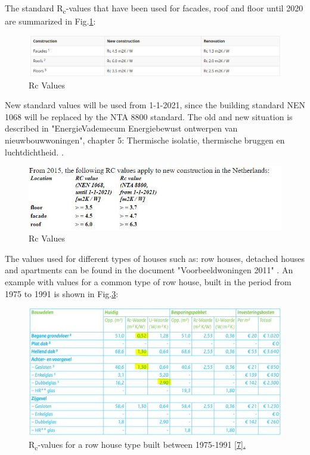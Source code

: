 The standard R\textsubscript{c}-values that have been used for facades, roof and floor until 2020 are summarized in Fig.\ref{fig:Rcvalues}:

\begin{figure}[H]
	\centering
	\includegraphics[width=1.0\columnwidth]{Pictures/Rc_values_2020.JPG}
	\caption[Short title]{Rc Values \cite{ISOL}}
	\label{fig:Rcvalues}
\end{figure}

New standard values will be used from 1-1-2021, since the building standard NEN 1068 will be replaced by the NTA 8800 standard. The old and new situation is described in "EnergieVademecum Energiebewust ontwerpen van nieuwbouwwoningen", chapter 5: Thermische isolatie, thermische bruggen en luchtdichtheid.
\cite{ISSO}.

\begin{figure}[H]
	\centering
	\includegraphics[width=1.0\columnwidth]{Pictures/Rc_values_2021.JPG}
	\caption[Short title]{Rc Values \cite{RVALUE}}
	\label{fig:newRc}
\end{figure}

The values used for different types of houses such as: row houses, detached houses and apartments can be found in the document "Voorbeeldwoningen 2011" \cite{VOORBEELD}. An example with values for a common type of row house, built in the period from 1975 to 1991 is shown in Fig.\ref{row_house}:


\begin{figure}[H]
	\centering
	\includegraphics[width=0.8\columnwidth]{Pictures/row_house_1975-1991.JPG}
	\caption[Short title]{R\textsubscript{c}-values for a row house type built between 1975-1991 \href{Voorbeeldwoningen 2011 bestaande bouw.pdf}{[7].}}
	\label{row_house}
\end{figure} 
\newpage

